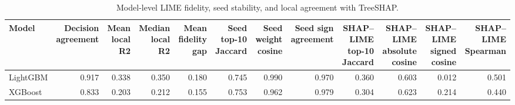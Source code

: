 \begin{table}
\caption{Model-level LIME fidelity, seed stability, and local agreement with TreeSHAP.}
\label{tab:lime_model_reliability}
\begin{tabular}{lrrrrrrrrrrr}
\toprule
Model & Decision agreement & Mean local R2 & Median local R2 & Mean fidelity gap & Seed top-10 Jaccard & Seed weight cosine & Seed sign agreement & SHAP–LIME top-10 Jaccard & SHAP–LIME absolute cosine & SHAP–LIME signed cosine & SHAP–LIME Spearman \\
\midrule
LightGBM & 0.917 & 0.338 & 0.350 & 0.180 & 0.745 & 0.990 & 0.970 & 0.360 & 0.603 & 0.012 & 0.501 \\
XGBoost & 0.833 & 0.203 & 0.212 & 0.155 & 0.753 & 0.962 & 0.979 & 0.304 & 0.623 & 0.214 & 0.440 \\
\bottomrule
\end{tabular}
\end{table}
